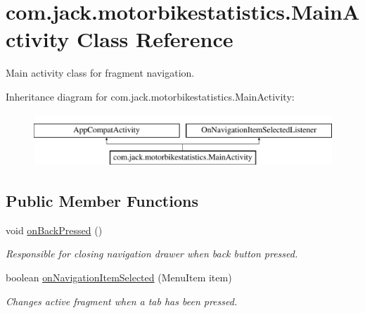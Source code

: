 \hypertarget{classcom_1_1jack_1_1motorbikestatistics_1_1_main_activity}{}\section{com.\+jack.\+motorbikestatistics.\+Main\+Activity Class Reference}
\label{classcom_1_1jack_1_1motorbikestatistics_1_1_main_activity}


Main activity class for fragment navigation.  


Inheritance diagram for com.\+jack.\+motorbikestatistics.\+Main\+Activity\+:\begin{figure}[H]
\begin{center}
\leavevmode
\includegraphics[height=2.000000cm]{classcom_1_1jack_1_1motorbikestatistics_1_1_main_activity}
\end{center}
\end{figure}
\subsection*{Public Member Functions}
\begin{DoxyCompactItemize}
\item 
\mbox{\label{classcom_1_1jack_1_1motorbikestatistics_1_1_main_activity_a7cc508edb3037695e1a75eb342124fbc}} 
void \hyperlink{classcom_1_1jack_1_1motorbikestatistics_1_1_main_activity_a7cc508edb3037695e1a75eb342124fbc}{on\+Back\+Pressed} ()
\begin{DoxyCompactList}\small\item\em Responsible for closing navigation drawer when back button pressed. \end{DoxyCompactList}\item 
boolean \hyperlink{classcom_1_1jack_1_1motorbikestatistics_1_1_main_activity_a38f3fc764869f436e53413ae14590872}{on\+Navigation\+Item\+Selected} (Menu\+Item item)
\begin{DoxyCompactList}\small\item\em Changes active fragment when a tab has been pressed. \end{DoxyCompactList}\end{DoxyCompactItemize}
